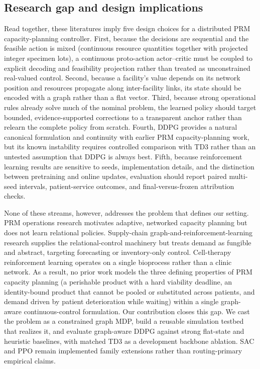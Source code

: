 \documentclass[preprint,review,12pt]{elsarticle}
\begin{document}
\subsection{Research gap and design implications}
Read together, these literatures imply five design choices for a distributed PRM capacity-planning controller. First, because the decisions are sequential and the feasible action is mixed (continuous resource quantities together with projected integer specimen lots), a continuous proto-action actor--critic must be coupled to explicit decoding and feasibility projection rather than treated as unconstrained real-valued control. Second, because a facility's value depends on its network position and resources propagate along inter-facility links, its state should be encoded with a graph rather than a flat vector. Third, because strong operational rules already solve much of the nominal problem, the learned policy should target bounded, evidence-supported corrections to a transparent anchor rather than relearn the complete policy from scratch. Fourth, DDPG provides a natural canonical formulation and continuity with earlier PRM capacity-planning work, but its known instability requires controlled comparison with TD3 rather than an untested assumption that DDPG is always best. Fifth, because reinforcement learning results are sensitive to seeds, implementation details, and the distinction between pretraining and online updates, evaluation should report paired multi-seed intervals, patient-service outcomes, and final-versus-frozen attribution checks.

None of these streams, however, addresses the problem that defines our setting. PRM operations research motivates adaptive, networked capacity planning but does not learn relational policies. Supply-chain graph-and-reinforcement-learning research supplies the relational-control machinery but treats demand as fungible and abstract, targeting forecasting or inventory-only control. Cell-therapy reinforcement learning operates on a single bioprocess rather than a clinic network. As a result, no prior work models the three defining properties of PRM capacity planning (a perishable product with a hard viability deadline, an identity-bound product that cannot be pooled or substituted across patients, and demand driven by patient deterioration while waiting) within a single graph-aware continuous-control formulation. Our contribution closes this gap. We cast the problem as a constrained graph MDP, build a reusable simulation testbed that realizes it, and evaluate graph-aware DDPG against strong flat-state and heuristic baselines, with matched TD3 as a development backbone ablation. SAC and PPO remain implemented family extensions rather than routing-primary empirical claims.
\end{document}
